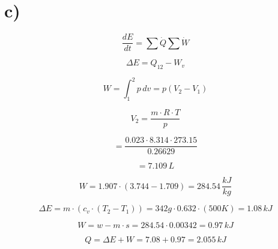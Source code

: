 

\section*{c)}

\[
\frac{dE}{dt} = \sum \dot{Q} \sum \dot{W}
\]

\[
\Delta E = Q_{12} - W_v
\]

\[
W = \int_{1}^{2} p \, dv = p (V_2 - V_1)
\]

\[
V_2 = \frac{m \cdot R \cdot T}{p}
\]

\[
= \frac{0.023 \cdot 8.314 \cdot 273.15}{0.26629}
\]

\[
= 7.109 \, L
\]

\[
W = 1.907 \cdot (3.744 - 1.709) = 284.54 \, \frac{kJ}{kg}
\]

\[
\Delta E = m \cdot (c_v \cdot (T_2 - T_1)) = 342g \cdot 0.632 \cdot (500K) = 1.08 \, kJ
\]

\[
W = w - m \cdot s = 284.54 \cdot 0.00342 = 0.97 \, kJ
\]

\[
Q = \Delta E + W = 7.08 + 0.97 = 2.055 \, kJ
\]